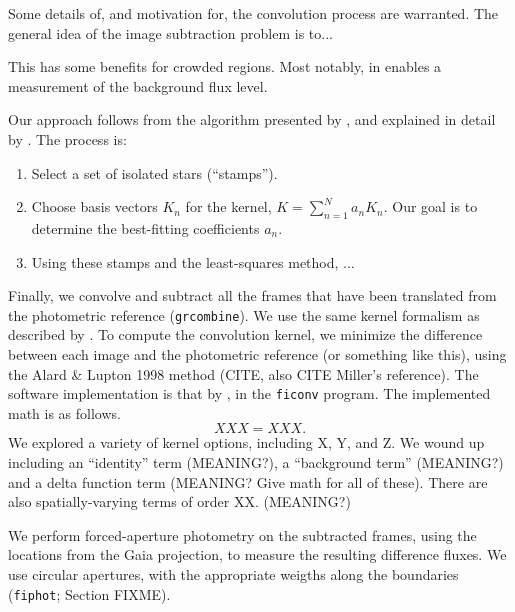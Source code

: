 \documentclass[12pt,twocolumn,tighten]{aastex62}
\begin{document}
Some details of, and motivation for, the convolution process are warranted.
The general idea of the image subtraction problem is to...

This has some benefits for crowded regions. Most notably, in enables a
measurement of the background flux level.

Our approach follows from the algorithm presented by
\citet{Alard_Lupton_1998}, and explained in detail by
\citet{miller_optimal_2008}.
The process is: %
\begin{enumerate}
  \item Select a set of isolated stars (``stamps'').
  \item Choose basis vectors $K_n$ for the kernel, $K = \sum_{n=1}^N
    a_n K_n$. Our goal is to determine the best-fitting coefficients
    $a_n$. 
  \item Using these stamps and the least-squares method, ...
\end{enumerate}



Finally, we convolve and subtract all the frames that have been
translated from the photometric reference (\texttt{grcombine}).
We use the same kernel formalism as described by
\citet{soares-furtado_image_2017}.
To compute the convolution kernel, we minimize the difference between
each image and the photometric reference (or something like this),
using the Alard \& Lupton 1998 method (CITE, also CITE Miller's
reference).
The software implementation is that by \citet{Pal_2009}, in the
\texttt{ficonv} program.
The implemented math is as follows.
\begin{equation}
  XXX = XXX. %
\end{equation}
We explored a variety of kernel options, including X, Y, and Z.
We wound up including an ``identity'' term (MEANING?), a ``background
term'' (MEANING?) and a delta function term (MEANING? Give math for
all of these).
There are also spatially-varying terms of order XX. (MEANING?)

We perform forced-aperture photometry on the subtracted frames,
using the locations from the Gaia projection, to measure the resulting
difference fluxes.
We use circular apertures, with the appropriate weigths along the
boundaries (\texttt{fiphot}; \citet{Pal_2009} Section FIXME).
\end{document}
